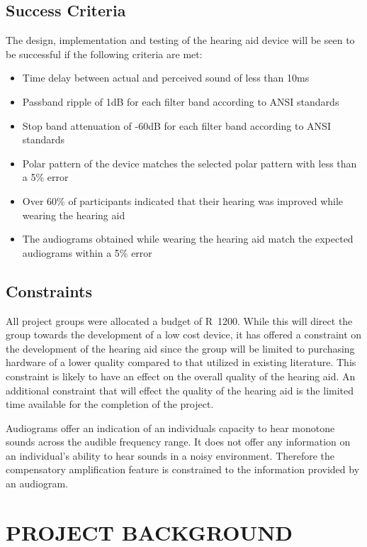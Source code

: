 \documentclass[10pt,twocolumn]{witseiepaper}
\begin{document}
\subsection{Success Criteria}
The design, implementation and testing of the hearing aid device will be seen to be successful if the following criteria are met:

\begin{itemize}
	\item Time delay between actual and perceived sound of less than 10ms
	\item Passband ripple of 1dB for each filter band according to ANSI standards
	\item Stop band attenuation of -60dB for each filter band according to ANSI standards
	\item Polar pattern of the device matches the selected polar pattern with less than a 5\% error
	\item Over 60\% of participants indicated that their hearing was improved while wearing the hearing aid	
	\item The audiograms obtained while wearing the hearing aid match the expected audiograms within a 5\% error
\end{itemize}

\subsection{Constraints}
All project groups were allocated a budget of R~1200. While this will direct the group towards the development of a low cost device, it has offered a constraint on the development of the hearing aid since the group will be limited to purchasing hardware of a lower quality compared to that utilized in existing literature. This constraint is likely to have an effect on the overall quality of the hearing aid. An additional constraint that will effect the quality of the hearing aid is the limited time available for the completion of the project. 

Audiograms offer an indication of an individuals capacity to hear monotone sounds across the audible frequency range. It does not offer any information on an individual's ability to hear sounds in a noisy environment. Therefore the compensatory amplification feature is constrained to the information provided by an audiogram. 

\section{PROJECT BACKGROUND}
\end{document}
